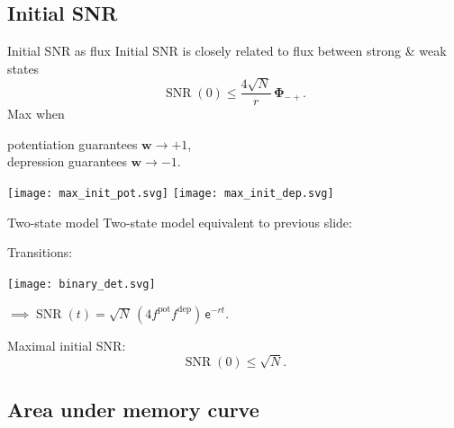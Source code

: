 \documentclass{beamer}%
\newcommand{\w}{\mathbf{w}}
\newcommand{\F}{\boldsymbol{\Phi}}
\DeclareMathOperator{\SNR}{SNR}
\DeclareMathOperator{\snr}{SNR}
\newcommand{\pot}{^{\text{pot}}}
\newcommand{\dep}{^{\text{dep}}}
\renewcommand{\e}{\mathsf{e}}
\begin{document}

\subsection{Initial SNR}


\begin{frame}{Initial SNR as flux}
%
 Initial SNR is closely related to flux between strong \& weak states
 \begin{equation*}
   \SNR(0) \leq \frac{4\sqrt{N}}{r}\,\F_{-+}.
 \end{equation*}
 Max when {\parbox[t]{8cm}{potentiation guarantees $\w\to+1$,\\
 depression guarantees $\w\to-1$.}}
 \begin{center}
   \texttt{[image: max\_init\_pot.svg]}
   \hp \hp
   \texttt{[image: max\_init\_dep.svg]}
 \end{center}
%
\end{frame}


\begin{frame}{Two-state model}
%
 Two-state model equivalent to previous slide:
  \begin{center}
  Transitions:
   \parbox{2cm}{\texttt{[image: binary\_det.svg]}}
   $\implies\snr(t)=\sqrt{N}\,(4 f\pot f\dep)\,\e^{-rt}.$
  \end{center}

 \vp Maximal initial SNR:\note[item]{$f\pot=\half$}
 \begin{equation*}
   \snr(0) \leq \sqrt{N}.
 \end{equation*}
%
\end{frame}


\subsection{Area under memory curve}
\end{document}
